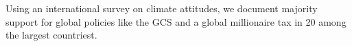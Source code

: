 Using an international survey on climate attitudes, we document majority support for global policies like the GCS and a global millionaire tax in 20 among the largest countriest. 